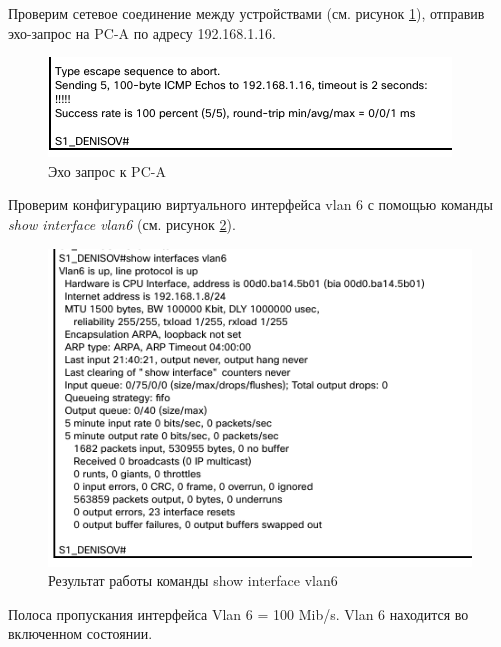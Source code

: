\documentclass[a4paper,14pt]{extarticle}
\begin{document}
{
	
Проверим сетевое соединение между устройствами (см. рисунок \ref{fig:switch-to-pc1}), отправив эхо-запрос на PC-A по адресу 192.168.1.16.

\begin{figure}[h!]
	\centering
	\includegraphics[width=0.6\linewidth]{images/switch-to-pc1}
	\caption{Эхо запрос к PC-A}
	\label{fig:switch-to-pc1}
\end{figure}





Проверим конфигурацию виртуального интерфейса vlan 6 с помощью команды \textit{show interface vlan6} (см. рисунок \ref{fig:show-interface-vlan6}).
\begin{figure}[h!]
	\centering
	\includegraphics[width=0.6\linewidth]{images/show-interface-vlan6}
	\caption{Результат работы команды show interface vlan6}
	\label{fig:show-interface-vlan6}
\end{figure}

Полоса пропускания интерфейса Vlan 6 = 100 Mib/s. Vlan 6 находится во включенном состоянии.



}
\end{document}
